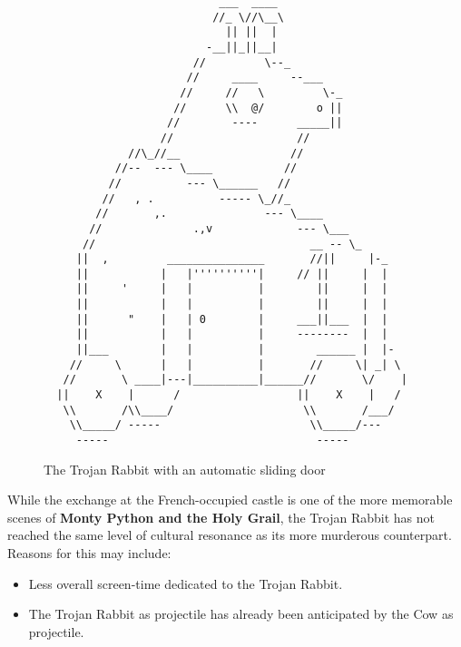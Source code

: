 \documentclass{metanorma}
\begin{document}
\begin{figure}
  \label{trojan-rabbit}
  \caption{The Trojan Rabbit with an automatic sliding door}
\begin{verbatim}
                           ___  ____
                          //_ \//\__\
                            || ||  |
                         -__||_||__|
                       //         \--_
                      //     ____     --___
                     //     //   \         \-_
                    //      \\  @/        o ||
                   //        ----      _____||
                  //                   //
             //\_//__                 //
           //--  --- \____           //
          //          --- \______   //
         //   , .          ----- \_//_
        //       ,.               --- \____
       //              .,v             --- \___
      //                                 __ -- \_
     ||  ,         _______________       //||     |-_
     ||           |   |''''''''''|     // ||     |  |
     ||     '     |   |          |        ||     |  |
     ||           |   |          |        ||     |  |
     ||      "    |   | 0        |     ___||___  |  |
     ||           |   |          |     --------  |  |
     ||___        |   |          |        ______ |  |-
    //     \      |   |          |       //     \| _| \
   //       \ ____|---|__________|______//       \/    |
  ||    X    |      /                  ||    X    |   /
   \\       /\\____/                    \\       /___/
    \\_____/ -----                       \\_____/---
     -----                                -----
\end{verbatim}
\end{figure}


\begin{reviewernote}
  While the exchange at the French-occupied castle is one of
  the more memorable scenes of 
  \textbf{Monty Python and the Holy Grail},
  the Trojan Rabbit has not reached the same level of cultural
  resonance as its more murderous counterpart. Reasons for this
  may include:

  \begin{itemize}
    \item Less overall screen-time dedicated to the Trojan Rabbit.
    \item The Trojan Rabbit as projectile has already been anticipated
    by the Cow as projectile.
  \end{itemize}
\end{reviewernote}
\end{document}
